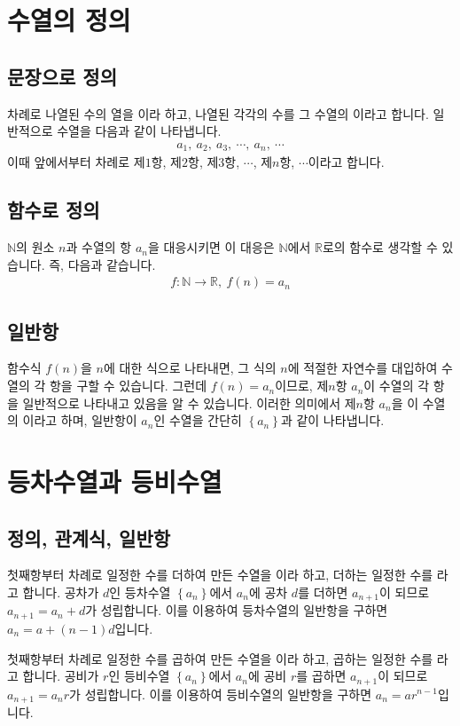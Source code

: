  
\section{수열의 정의}
\subsection{문장으로 정의}
차례로 나열된 수의 열을 이라 하고, 나열된 각각의 수를 그 수열의 이라고 합니다. 일반적으로 수열을 다음과 같이 나타냅니다.
\begin{align*}a_1,\:a_2,\:a_3 ,\: \cdots,\: a_n,\:\cdots\end{align*}
이때 앞에서부터 차례로 제$1$항, 제$2$항, 제$3$항, $\cdots$, 제$n$항, $\cdots$이라고 합니다.
\subsection{함수로 정의}
$\mathbb N$의 원소 $n$과 수열의 항 $a_n$을 대응시키면 이 대응은 $\mathbb N$에서 $\mathbb R$로의 함수로 생각할 수 있습니다. 즉, 다음과 같습니다.
\begin{align*} f : \mathbb N \longrightarrow \mathbb R, \: f(n)=a_n\end{align*}
\subsection{일반항}
함수식 $f(n)$을 $n$에 대한 식으로 나타내면, 그 식의 $n$에 적절한 자연수를 대입하여 수열의 각 항을 구할 수 있습니다. 그런데 $f(n)=a_n$이므로, 제$n$항 $a_n$이 수열의 각 항을 일반적으로 나타내고 있음을 알 수 있습니다. 이러한 의미에서 제$n$항 $a_n$을 이 수열의 이라고 하며, 일반항이 $a_n$인 수열을 간단히 $\left\{ a_n \right\} $과 같이 나타냅니다.
\section{등차수열과 등비수열}
\subsection{정의, 관계식, 일반항}
첫째항부터 차례로 일정한 수를 더하여 만든 수열을 이라 하고, 더하는 일정한 수를 라고 합니다. 공차가 $d$인 등차수열 $\left\{ a_n \right\} $에서 $a_n$에 공차 $d$를 더하면 $a_{n+1}$이 되므로 $a_{n+1} = a_n + d$가 성립합니다. 이를 이용하여 등차수열의 일반항을 구하면 $a_n = a + \left( n-1 \right) d$입니다.

첫째항부터 차례로 일정한 수를 곱하여 만든 수열을 이라 하고, 곱하는 일정한 수를 라고 합니다. 공비가 $r$인 등비수열 $\left\{ a_n \right\} $에서 $a_n$에 공비 $r$를 곱하면 $a_{n+1}$이 되므로 $a_{n+1} = a_nr$가 성립합니다. 이를 이용하여 등비수열의 일반항을 구하면 $a_n = ar^{n-1}$입니다.
\clearpage
